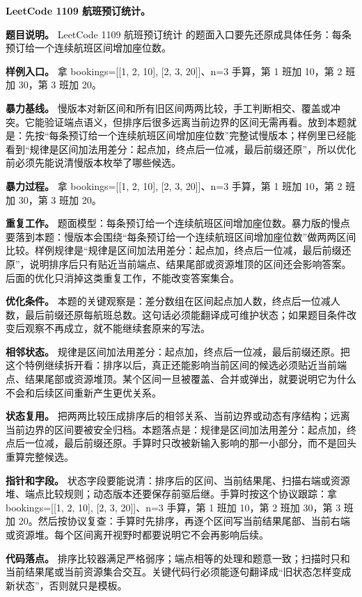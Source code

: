 \noindent\textbf{LeetCode 1109 航班预订统计。}

\textbf{题目说明。} LeetCode 1109 航班预订统计 的题面入口要先还原成具体任务：每条预订给一个连续航班区间增加座位数。

\textbf{样例入口。} 拿 bookings=[[1, 2, 10], [2, 3, 20]]、n=3 手算，第 1 班加 10，第 2 班加 30，第 3 班加 20。

\textbf{暴力基线。} 慢版本对新区间和所有旧区间两两比较，手工判断相交、覆盖或冲突。它能验证端点语义，但排序后很多远离当前边界的区间无需再看。放到本题就是：先按“每条预订给一个连续航班区间增加座位数”完整试慢版本；样例里已经能看到“规律是区间加法用差分：起点加，终点后一位减，最后前缀还原”，所以优化前必须先能说清慢版本枚举了哪些候选。

\textbf{暴力过程。} 拿 bookings=[[1, 2, 10], [2, 3, 20]]、n=3 手算，第 1 班加 10，第 2 班加 30，第 3 班加 20。

\textbf{重复工作。} 题面模型：每条预订给一个连续航班区间增加座位数。暴力版的慢点要落到本题：慢版本会围绕“每条预订给一个连续航班区间增加座位数”做两两区间比较。样例规律是“规律是区间加法用差分：起点加，终点后一位减，最后前缀还原”，说明排序后只有贴近当前端点、结果尾部或资源堆顶的区间还会影响答案。后面的优化只消掉这类重复工作，不能改变答案集合。

\textbf{优化条件。} 本题的关键观察是：差分数组在区间起点加人数，终点后一位减人数，最后前缀还原每航班总数。这句话必须能翻译成可维护状态；如果题目条件改变后观察不再成立，就不能继续套原来的写法。

\textbf{相邻状态。} 规律是区间加法用差分：起点加，终点后一位减，最后前缀还原。把这个特例继续拆开看：排序以后，真正还能影响当前区间的候选必须贴近当前端点、结果尾部或资源堆顶。某个区间一旦被覆盖、合并或弹出，就要说明它为什么不会和后续区间重新产生更优关系。

\textbf{状态复用。} 把两两比较压成排序后的相邻关系、当前边界或动态有序结构；远离当前边界的区间要被安全归档。本题落点是：规律是区间加法用差分：起点加，终点后一位减，最后前缀还原。手算时只改被新输入影响的那一小部分，而不是回头重算完整候选。

\textbf{指针和字段。} 状态字段要能说清：排序后的区间、当前结果尾、扫描右端或资源堆、端点比较规则；动态版本还要保存前驱后继。手算时按这个协议跟踪：拿 bookings=[[1, 2, 10], [2, 3, 20]]、n=3 手算，第 1 班加 10，第 2 班加 30，第 3 班加 20。然后按协议复查：手算时先排序，再逐个区间写当前结果尾部、当前右端或资源堆。每个区间离开视野时都要说明它不会再影响后续。

\textbf{代码落点。} 排序比较器满足严格弱序；端点相等的处理和题意一致；扫描时只和当前结果尾或当前资源集合交互。关键代码行必须能逐句翻译成“旧状态怎样变成新状态”，否则就只是模板。

